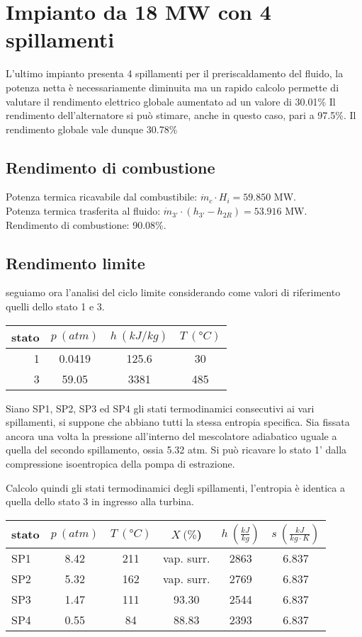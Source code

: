\section{Impianto da 18 MW con 4 spillamenti}
L'ultimo impianto presenta 4 spillamenti per il preriscaldamento del fluido, la potenza netta è necessariamente diminuita
ma un rapido calcolo permette di valutare il rendimento elettrico globale aumentato ad un valore di 30.01\%
Il rendimento dell'alternatore si può stimare, anche in questo caso, pari a 97.5\%.
Il rendimento globale vale dunque 30.78\%

\subsection{Rendimento di combustione}
Potenza termica ricavabile dal combustibile: $\dot m_c \cdot H_i = 59.850$ MW.\\
Potenza termica trasferita al fluido: $\dot m_{3'} \cdot (h_{3'} - h_{2R}) = 53.916$ MW.\\
Rendimento di combustione: 90.08\%.

\subsection{Rendimento limite}
seguiamo ora l'analisi del ciclo limite considerando come valori di riferimento quelli dello stato 1 e 3.
\begin{center}
    \begin{tabular}{r|c|c|c}
        stato    & $p\ (atm)$ & $h\ (kJ/kg)$ & $T\ (\text{°}C) $\\ \hline
        1   &        0.0419 &          125.6   &           30     \\ \hline
        3   &        59.05  &           3381   &           485
    \end{tabular}
\end{center}
Siano SP1, SP2, SP3 ed SP4 gli stati termodinamici consecutivi ai vari spillamenti, si suppone che abbiano tutti la stessa entropia specifica.
Sia fissata ancora una volta la pressione all'interno del mescolatore adiabatico uguale a quella del secondo spillamento, ossia 5.32 atm.
Si può ricavare lo stato 1' dalla compressione isoentropica della pompa di estrazione.

Calcolo quindi gli stati termodinamici degli spillamenti, l'entropia è identica a quella dello stato 3 in ingresso alla turbina.
\begin{center}
    \begin{tabular}{l|c|c|c|c|c}
        stato    & $p\ (atm)$ & $T\ (\text{°}C) $&$X\ (\%$)& $h\ (\frac{kJ}{kg})$  & $s\ (\frac{kJ}{kg\cdot K})$\\ \hline
        SP1   &       8.42 &     211     & vap. surr. &  2863   &6.837 \\ \hline    
        SP2  &        5.32    &    162    & vap. surr. & 2769  &6.837 \\ \hline    
        SP3  &      1.47       &    111    &  93.30    &2544 &6.837   \\ \hline
        SP4   &    0.55      &      84    &    88.83   & 2393&6.837 
    \end{tabular}
\end{center}


